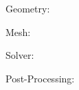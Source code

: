 

\background{7\semcm}{4.2\semcm}
           {\scalebox{0.3}{}}

\begin{slide}

Geometry:

\end{slide}

\background{7\semcm}{4.2\semcm}
           {\scalebox{0.3}{}}

\begin{slide}

Mesh:

\end{slide}

\background{7\semcm}{4.2\semcm}
           {\scalebox{0.3}{}}

\begin{slide}

Solver:

\end{slide}

\background{7\semcm}{4.2\semcm}
           {\scalebox{0.3}{}}

\begin{slide}

Post-Processing:

\end{slide}



